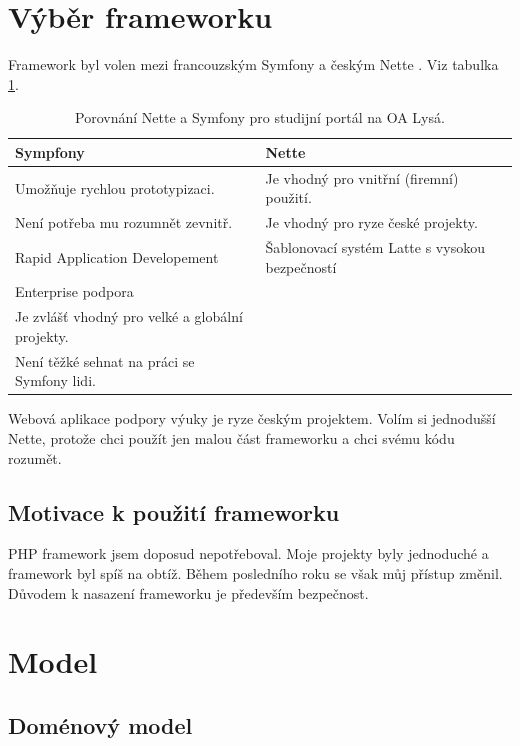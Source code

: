 \documentclass[thesis=B,czech]{FITthesis}[2012/06/26]
\begin{document}
\section{Výběr frameworku}

Framework byl volen mezi francouzským Symfony a českým Nette \cite{pnovotny}. Viz tabulka  \ref{table:frameworsk}.

\begin{table}
\centering
\begin{tabular}{| p{5cm} | p{5cm} |}
  \hline
    \bfseries Sympfony & \bfseries Nette \\
    \hline
    Umožňuje rychlou prototypizaci. & Je vhodný pro vnitřní (firemní) použití. \\
    Není potřeba mu rozumnět zevnitř. & Je vhodný pro ryze české projekty.\\
    Rapid Application Developement &  Šablonovací systém Latte s vysokou bezpečností \cite{phpfashion}\\
    Enterprise podpora &  \\
    Je zvlášť vhodný pro velké a globální projekty. &  \\
    Není těžké sehnat na práci se Symfony lidi. & \\ 
    \hline
\end{tabular}
\caption[Porovnání Nette a Symfony]{Porovnání Nette a Symfony pro studijní portál na OA Lysá. }
\label{table:frameworsk}
\end{table}

Webová aplikace podpory výuky je ryze českým projektem. Volím si jednodušší Nette, protože chci použít jen malou část frameworku a chci svému kódu rozumět.

\subsection{Motivace k použití frameworku}

PHP framework jsem doposud nepotřeboval. Moje projekty byly jednoduché a framework byl spíš na obtíž. Během posledního roku se však můj přístup změnil. Důvodem k nasazení frameworku je především bezpečnost.

\section{Model}

\subsection{Doménový model}
\end{document}
